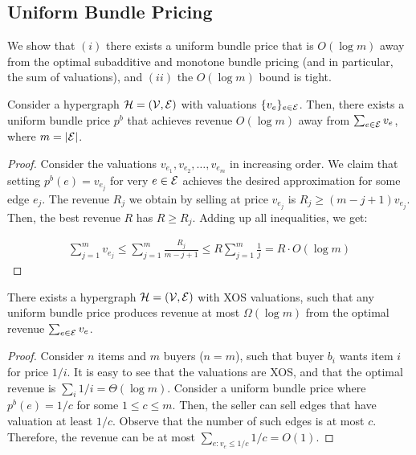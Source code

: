 \subsection{Uniform Bundle Pricing}

We show that $(i)$ there exists a uniform bundle price that is $O(\log m)$ away from the optimal subadditive and monotone bundle pricing (and in particular, the sum of valuations), and
$(ii)$ the $O(\log m)$ bound is tight.

\begin{lemma}
Consider a hypergraph $\mathcal{H} = (\mathcal{V}, \mathcal{E})$ with valuations $\{v_e\}_{e \in \mathcal{E}}$. Then, there exists a uniform bundle price $p^{b}$ that achieves revenue $O(\log m)$ away from  $\sum_{e \in \mathcal{E}} v_e$, where $m = |\mathcal{E}|$.
\end{lemma}

\begin{proof}
Consider the valuations $v_{e_1}, v_{e_2}, \dots, v_{e_m}$ in increasing order. We claim that setting $p^{b}(e)  = v_{e_j}$ for very $e \in \mathcal{E}$ achieves the 
desired approximation for some edge $e_{j}$. 
The revenue $R_j$ we obtain by selling at price $v_{e_j}$ is $R_j \geq (m-j+1)v_{e_j} $. Then, the best revenue $R$ has $R \geq R_j$.
Adding up all inequalities, we get:
	
	\begin{equation*}
	\begin{aligned}
	\sum_{j=1}^m v_{e_j} \leq  \sum_{j=1}^m \frac{R_j}{m-j+1} \leq R \sum_{j=1}^m \frac{1}{j} = R \cdot O(\log m) 
	\end{aligned}
	\end{equation*}
\end{proof}



\begin{lemma}
There exists a hypergraph $\mathcal{H} = (\mathcal{V}, \mathcal{E})$ with XOS valuations, such that any uniform bundle price produces revenue at most $\Omega(\log m)$ from the optimal revenue
$\sum_{e \in \mathcal{E}} v_e$.
\end{lemma}	

\begin{proof}
	Consider $n$ items and $m$ buyers ($n=m$), such that buyer $b_i$ wants item $i$ for price $1/i$. It is easy to see that the valuations are XOS, and that the optimal revenue
	is $\sum_i 1/i = \Theta(\log m)$. Consider a uniform bundle price where $p^b(e) = 1/c$ for some $1 \leq c \leq m$. Then, the seller can sell edges that have valuation at least $1/c$. Observe that the number of such edges is at most $c$. Therefore, the revenue can be at most $\sum_{e:v_e \leq 1/c} 1/c = O(1)$.
\end{proof}

